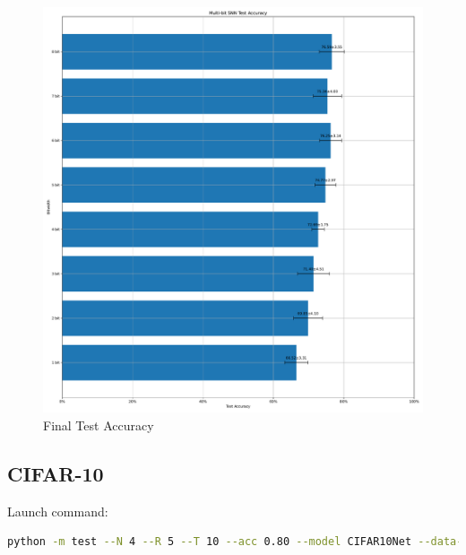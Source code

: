         \begin{figure}[H]
            \centering
            \includegraphics[width=\textwidth]{../standard/DVSGesture/plots/dvsgesture_final_acc.pdf}
            \caption{Final Test Accuracy}
        \end{figure}

    \subsection{CIFAR-10}
    \label{appendix:accuracy_curves_cifar10}
        Launch command: 
        \begin{lstlisting}[language=Bash, basicstyle=\small, breaklines=true]
python -m test --N 4 --R 5 --T 10 --acc 0.80 --model CIFAR10Net --data-path /scratch/zyi/codeSpace/data --dataset CIFAR10 --batch-size 128 --opt adam --lr 1e-5 --lr-scheduler none --epochs 50 --lr-warmup-epochs 0 --output-dir /scratch/zyi/codeSpace/MultibitSpikes
        \end{lstlisting}

